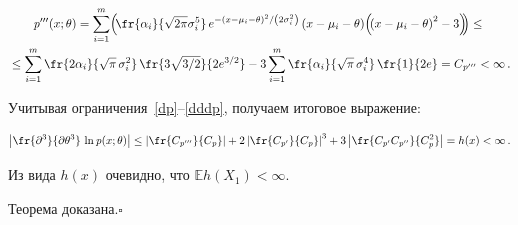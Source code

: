 \vspace*{-12pt}





\noindent


\begin{multline}


\label{dddp}


\mathit{p}'''(x;\theta) = 


\sum\limits_{i=1}^m\!\left(\!\fr{\alpha_i}{\sqrt{2\pi}\sigma_i^5}\,e^{{-\left(x-


\mu_i-\theta\right)^2}/\left({2\sigma_i^2}\right)}\left(x-\mu_i-\theta\right)\!\left(\!


\left(x-\mu_i-\theta\right)^2 - 


3\right)\!\!\right) \le{}\hspace*{-0.17236pt} \\ 


{}\le 


\sum\limits_{i=1}^m\fr{2\alpha_i}{\sqrt{\pi}\,\sigma_i^2}\,


\fr{3\sqrt{3/2}}{2e^{3/2}} - 3\sum\limits_{i=1}^m


\fr{\alpha_i}{\sqrt{\pi}\,\sigma_i^4}\,\fr{1}{2e} = 


C_{\mathit{p}'''} < \infty \,.


\end{multline}








Учитывая ограничения~\eqref{dp}--\eqref{dddp}, получаем итоговое выражение:


\begin{equation*}


\left|\fr{\partial^3}{\partial \theta^3}\, \ln \mathit{p}(x;\theta) \right| \le 


\left|\fr{C_{\mathit{p}'''}}{C_{\mathit{p}}}\right| + 


2\left|\fr{C_{\mathit{p}'}}{C_{\mathit{p}}}\right|^3 + 


3\left|\fr{C_{\mathit{p}'}C_{\mathit{p}''}}{C_{\mathit{p}}^2}\right| = h(x) < 


\infty\,.


\end{equation*}





Из вида $h(x)$ очевидно, что $\mathbb{E}h(X_1) < \infty$.


Теорема доказана.\hfill$\square$





